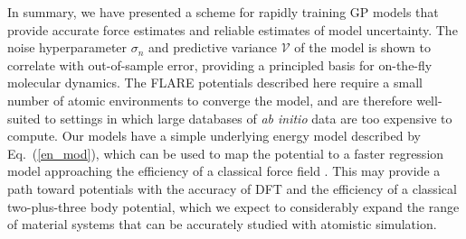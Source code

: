 \documentclass[%
reprint,
superscriptaddress,
amsmath,amssymb,
aps,
prl,
]{revtex4-1}
\begin{document}
In summary, we have presented a scheme for rapidly training GP models that provide accurate force estimates and reliable estimates of model uncertainty. The noise hyperparameter $\sigma_n$ and predictive variance $\mathcal{V}$ of the model is shown to correlate with out-of-sample error, providing a principled basis for on-the-fly molecular dynamics. The FLARE potentials described here require a small number of atomic environments to converge the model, and are therefore well-suited to settings in which large databases of \textit{ab initio} data are too expensive to compute. Our models have a simple underlying energy model described by Eq.\ (\ref{en_mod}), which can be used to map the potential to a faster regression model approaching the efficiency of a classical force field \cite{glielmo2018efficient}. This may provide a path toward potentials with the accuracy of DFT and the efficiency of a classical two-plus-three body potential, which we expect to considerably expand the range of material systems that can be accurately studied with atomistic simulation.

\end{document}
